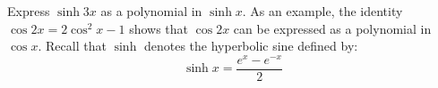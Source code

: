 Express $\sinh 3x$ as a polynomial in $\sinh x$. As an example, the identity
$\cos 2x = 2 \cos ^2 x - 1$ shows that $\cos 2x$ can be expressed as a
polynomial in $\cos x$. Recall that $\sinh$ denotes the hyperbolic sine defined
by: $$ \sinh x = \frac{e^x - e^{-x}}{2} $$
